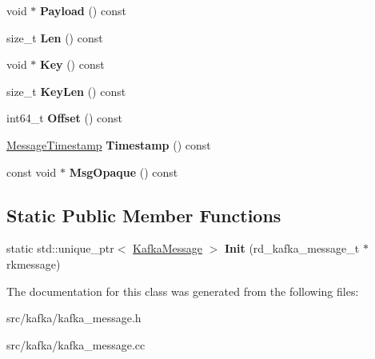 \begin{DoxyCompactItemize}
\item 
void $\ast$ {\bfseries Payload} () const \hypertarget{classlog2hdfs_1_1KafkaMessage_ab221c5b3781eee260c5792e30c51ae53}{}\label{classlog2hdfs_1_1KafkaMessage_ab221c5b3781eee260c5792e30c51ae53}

\item 
size\+\_\+t {\bfseries Len} () const \hypertarget{classlog2hdfs_1_1KafkaMessage_a028e769ea3da9d39f6563cec7064fb70}{}\label{classlog2hdfs_1_1KafkaMessage_a028e769ea3da9d39f6563cec7064fb70}

\item 
void $\ast$ {\bfseries Key} () const \hypertarget{classlog2hdfs_1_1KafkaMessage_aa82a8e1227f97cd979e06dda853011ba}{}\label{classlog2hdfs_1_1KafkaMessage_aa82a8e1227f97cd979e06dda853011ba}

\item 
size\+\_\+t {\bfseries Key\+Len} () const \hypertarget{classlog2hdfs_1_1KafkaMessage_af5807e0ecd8970496e89faed70dbc452}{}\label{classlog2hdfs_1_1KafkaMessage_af5807e0ecd8970496e89faed70dbc452}

\item 
int64\+\_\+t {\bfseries Offset} () const \hypertarget{classlog2hdfs_1_1KafkaMessage_a416a397ddd429def2261b8846eee35f7}{}\label{classlog2hdfs_1_1KafkaMessage_a416a397ddd429def2261b8846eee35f7}

\item 
\hyperlink{classlog2hdfs_1_1MessageTimestamp}{Message\+Timestamp} {\bfseries Timestamp} () const \hypertarget{classlog2hdfs_1_1KafkaMessage_a08478e3818badfefbbf6ce5cbb733e4c}{}\label{classlog2hdfs_1_1KafkaMessage_a08478e3818badfefbbf6ce5cbb733e4c}

\item 
const void $\ast$ {\bfseries Msg\+Opaque} () const \hypertarget{classlog2hdfs_1_1KafkaMessage_adc3fe2161a0db822fac0e5b880a1b115}{}\label{classlog2hdfs_1_1KafkaMessage_adc3fe2161a0db822fac0e5b880a1b115}

\end{DoxyCompactItemize}
\subsection*{Static Public Member Functions}
\begin{DoxyCompactItemize}
\item 
static std\+::unique\+\_\+ptr$<$ \hyperlink{classlog2hdfs_1_1KafkaMessage}{Kafka\+Message} $>$ {\bfseries Init} (rd\+\_\+kafka\+\_\+message\+\_\+t $\ast$rkmessage)\hypertarget{classlog2hdfs_1_1KafkaMessage_acde8ac3e69056b95bb71cd0f014320a3}{}\label{classlog2hdfs_1_1KafkaMessage_acde8ac3e69056b95bb71cd0f014320a3}

\end{DoxyCompactItemize}


The documentation for this class was generated from the following files\+:\begin{DoxyCompactItemize}
\item 
src/kafka/kafka\+\_\+message.\+h\item 
src/kafka/kafka\+\_\+message.\+cc\end{DoxyCompactItemize}
